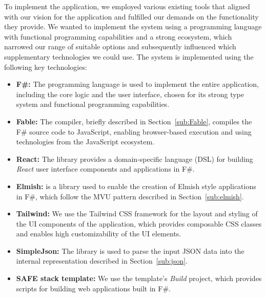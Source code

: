 To implement the application, we employed various existing tools that aligned with our vision for the application and fulfilled our demands on the functionality they provide.
We wanted to implement the system using a programming language with functional programming capabilities and a strong ecosystem, which narrowed our range of suitable options and subsequently influenced which supplementary technologies we could use.
The system is implemented using the following key technologies:
\begin{itemize}
	\item \textbf{F\#:} The \citet{fsharp} programming language is used to implement the entire application, including the core logic and the user interface, chosen for its strong type system and functional programming capabilities.
	\item \textbf{Fable:} The \citet{fable} compiler, briefly described in Section~\ref{sub:Fable}, compiles the F\# source code to JavaScript, enabling browser-based execution and using technologies from the JavaScript ecosystem.
	\item \textbf{React:} The \citet{feliz} library provides a domain-specific language (DSL) for building \emph{React} user interface components and applications in F\#.
	\item \textbf{Elmish:} \citet{elmish} is a library used to enable the creation of Elmish style applications in F\#, which follow the MVU pattern described in Section~\ref{sub:elmish}.
	\item \textbf{Tailwind:} We use the Tailwind CSS framework for the layout and styling of the UI components of the application, which provides composable CSS classes and enables high customizability of the UI elements.
	\item \textbf{SimpleJson:} The \citet{simpleJson} library is used to parse the input JSON data into the internal representation described in Section~\ref{sub:json}.
	\item \textbf{SAFE stack template:} We use the \citet{safestack} template's \emph{Build} project, which provides scripts for building web applications built in F\#.
\end{itemize}

\medskip

